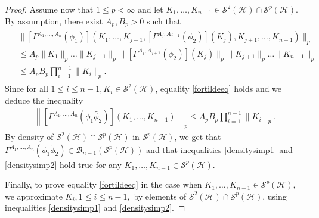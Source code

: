 \documentclass[12pt]{amsart}
\theoremstyle{remark}
\begin{document}
\begin{proof}
Assume now that $1\leq p < \infty$ and let $K_1, \ldots, K_{n-1} \in \mathcal{S}^2(\mathcal{H}) \cap \mathcal{S}^p(\mathcal{H})$. By assumption, there exist $A_p, B_p >0$ such that 
\begin{align}\label{densitysimp1}
\begin{split}
& \| \left[ \Gamma^{A_1, \ldots, A_n}(\phi_1)\right] \left(K_1, \ldots, K_{j-1}, \left[\Gamma^{A_j, A_{j+1}}(\phi_2)\right](K_j), K_{j+1}, \ldots, K_{n-1}\right) \|_p \\
& \leq A_p \|K_1\|_p \ldots \|K_{j-1}\|_p \| \left[\Gamma^{A_j, A_{j+1}}(\phi_2)\right](K_j) \|_p \|K_{j+1}\|_p \ldots \| K_{n-1}\|_p \\
& \leq A_p B_p \prod_{i=1}^{n-1} \|K_i\|_p.
\end{split}
\end{align}
Since for all $1\leq i \leq n-1, K_i \in \mathcal{S}^2(\mathcal{H})$, equality \eqref{fortildeeq} holds and we deduce the inequality
\begin{align}\label{densitysimp2}
\left\| \left[ \Gamma^{A_1, \ldots, A_n}(\phi_1 \widetilde{\phi_2})\right] (K_1, \ldots, K_{n-1}) \right\|_p  \leq A_p B_p \prod_{i=1}^{n-1} \|K_i\|_p.
\end{align}
By density of $\mathcal{S}^2(\mathcal{H}) \cap \mathcal{S}^p(\mathcal{H})$ in $\mathcal{S}^p(\mathcal{H})$, we get that $\Gamma^{A_1, \ldots, A_n}(\phi_1 \widetilde{\phi_2}) \in \mathcal{B}_{n-1}(\mathcal{S}^p(\mathcal{H}))$ and that inequalities \eqref{densitysimp1} and \eqref{densitysimp2} hold true for any $K_1, \ldots, K_{n-1} \in \mathcal{S}^p(\mathcal{H})$.

Finally, to prove equality \eqref{fortildeeq} in the case when $K_1, \ldots, K_{n-1} \in \mathcal{S}^p(\mathcal{H})$, we approximate $K_i, 1\leq i \leq n-1,$ by elements of $\mathcal{S}^2(\mathcal{H}) \cap \mathcal{S}^p(\mathcal{H})$, using inequalities \eqref{densitysimp1} and \eqref{densitysimp2}.

\end{proof}
\end{document}
